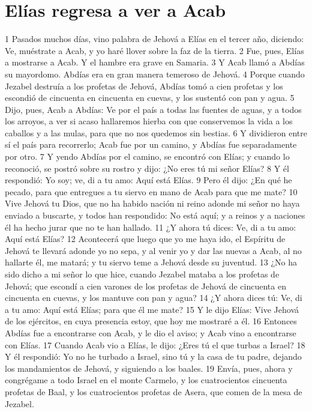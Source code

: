 \section*{Elías regresa a ver a Acab}

1 Pasados muchos días, vino palabra de Jehová a Elías en el tercer año, diciendo: Ve, muéstrate a Acab, y yo haré llover sobre la faz de la tierra.
2 Fue, pues, Elías a mostrarse a Acab. Y el hambre era grave en Samaria.
3 Y Acab llamó a Abdías su mayordomo. Abdías era en gran manera temeroso de Jehová.
4 Porque cuando Jezabel destruía a los profetas de Jehová, Abdías tomó a cien profetas y los escondió de cincuenta en cincuenta en cuevas, y los sustentó con pan y agua.
5 Dijo, pues, Acab a Abdías: Ve por el país a todas las fuentes de aguas, y a todos los arroyos, a ver si acaso hallaremos hierba con que conservemos la vida a los caballos y a las mulas, para que no nos quedemos sin bestias.
6 Y dividieron entre sí el país para recorrerlo; Acab fue por un camino, y Abdías fue separadamente por otro.
7 Y yendo Abdías por el camino, se encontró con Elías; y cuando lo reconoció, se postró sobre su rostro y dijo: ¿No eres tú mi señor Elías?
8 Y él respondió: Yo soy; ve, di a tu amo: Aquí está Elías.
9 Pero él dijo: ¿En qué he pecado, para que entregues a tu siervo en mano de Acab para que me mate?
10 Vive Jehová tu Dios, que no ha habido nación ni reino adonde mi señor no haya enviado a buscarte, y todos han respondido: No está aquí; y a reinos y a naciones él ha hecho jurar que no te han hallado.
11 ¿Y ahora tú dices: Ve, di a tu amo: Aquí está Elías?
12 Acontecerá que luego que yo me haya ido, el Espíritu de Jehová te llevará adonde yo no sepa, y al venir yo y dar las nuevas a Acab, al no hallarte él, me matará; y tu siervo teme a Jehová desde su juventud.
13 ¿No ha sido dicho a mi señor lo que hice, cuando Jezabel mataba a los profetas de Jehová; que escondí a cien varones de los profetas de Jehová de cincuenta en cincuenta en cuevas, y los mantuve con pan y agua?
14 ¿Y ahora dices tú: Ve, di a tu amo: Aquí está Elías; para que él me mate?
15 Y le dijo Elías: Vive Jehová de los ejércitos, en cuya presencia estoy, que hoy me mostraré a él.
16 Entonces Abdías fue a encontrarse con Acab, y le dio el aviso; y Acab vino a encontrarse con Elías.
17 Cuando Acab vio a Elías, le dijo: ¿Eres tú el que turbas a Israel?
18 Y él respondió: Yo no he turbado a Israel, sino tú y la casa de tu padre, dejando los mandamientos de Jehová, y siguiendo a los baales.
19 Envía, pues, ahora y congrégame a todo Israel en el monte Carmelo, y los cuatrocientos cincuenta profetas de Baal, y los cuatrocientos profetas de Asera, que comen de la mesa de Jezabel.

